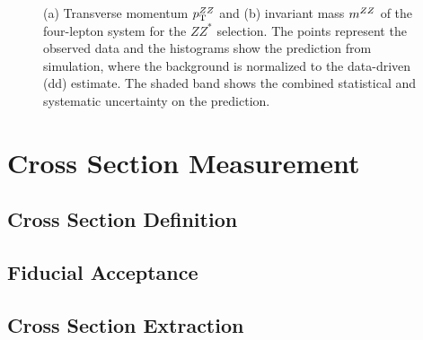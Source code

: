 \begin{figure}[htbp]
 \begin{center}
\caption{\label{fig:kindists_zzs}(a) Transverse momentum $p_{\mathrm{T}}^{ZZ}$ and (b) invariant mass $m^{ZZ}$ of the
           four-lepton system for the $ZZ^{*}$ selection. The points represent the observed data and the 
           histograms show the prediction from simulation, where the background
           is normalized to the data-driven (dd) estimate. 
           The shaded band 
           shows the combined statistical and systematic uncertainty on the prediction. 
}
\end{center}
\end{figure}

\section{Cross Section Measurement}
\subsection{Cross Section Definition}
\subsection{Fiducial Acceptance}
\subsection{Cross Section Extraction}
